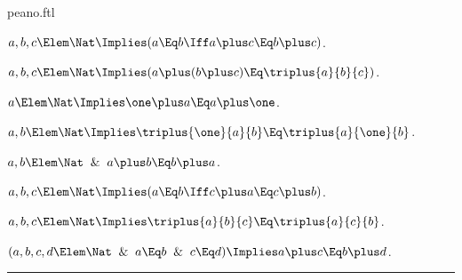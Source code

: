 \documentclass{stex}
\begin{document}
\begin{smodule}{peano.ftl}
\begin{forthel}
  \begin{theorem*}[title=22,name=P22]
    $a,b,c \Elem \Nat \Implies (a \Eq b \Iff a \plus c \Eq b \plus c)$.
  \end{theorem*}

  \begin{theorem*}[title=23,name=P23]
    $a,b,c \Elem \Nat \Implies (a \plus (b \plus c) \Eq \triplus{a}{b}{c})$.
  \end{theorem*}

  \begin{theorem*}[title=24,name=P24]
    $a \Elem \Nat \Implies \one \plus a \Eq a \plus \one$.
  \end{theorem*}

  \begin{theorem*}[title=24',name=P24prime]
    $a,b \Elem \Nat \Implies \triplus{\one}{a}{b} \Eq \triplus{a}{\one}{b}$.
  \end{theorem*}

  \begin{theorem*}[title=25,name=P25]
    $a,b \Elem \Nat \And a \plus b \Eq b \plus a$.
  \end{theorem*}

  \begin{theorem*}[title=26,name=P26]
    $a,b,c \Elem \Nat \Implies (a \Eq b \Iff c \plus a \Eq c \plus b)$.
  \end{theorem*}

  \begin{theorem*}[title=27,name=P27]
    $a,b,c \Elem \Nat \Implies \triplus{a}{b}{c} \Eq \triplus{a}{c}{b}$.
  \end{theorem*}

  \begin{theorem*}[title=28,name=P28]
    $(a,b,c,d \Elem \Nat \And a \Eq b \And c \Eq d) \Implies a \plus c \Eq b \plus d$.
  \end{theorem*}
\end{forthel}

\vspace{1em}\hrule

\titleformat{\section}[hang]{\Large\bfseries}{}{0em}{}

\printbibliography
{}

\end{smodule}
\end{document}
